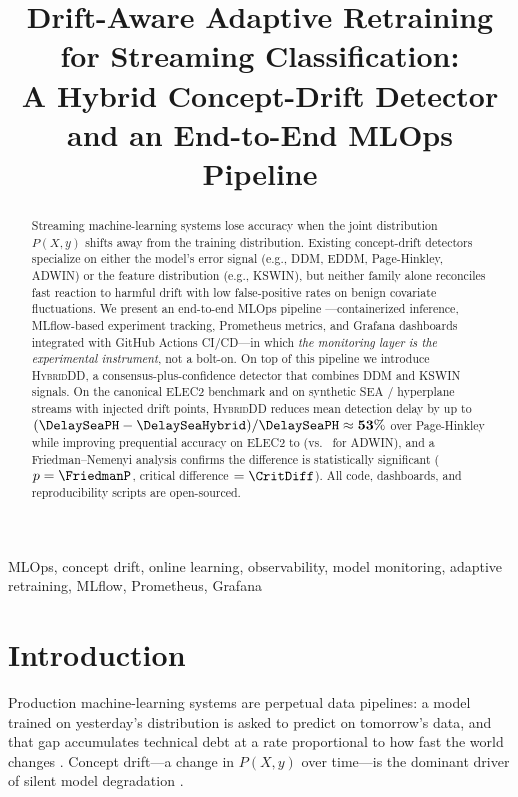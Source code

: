 \documentclass[conference]{IEEEtran}
\title{Drift-Aware Adaptive Retraining for Streaming Classification:\\
A Hybrid Concept-Drift Detector and an End-to-End MLOps Pipeline}
\author{
  \IEEEauthorblockN{Shahmir Asif}
  \IEEEauthorblockA{22i-1883 \\
    FAST-NUCES, Islamabad \\
    \texttt{i221883@nu.edu.pk}}
\and
  \IEEEauthorblockN{AbuBakr}
  \IEEEauthorblockA{22i-1934 \\
    FAST-NUCES, Islamabad \\
    \texttt{i221934@nu.edu.pk}}
\and
  \IEEEauthorblockN{Zaid}
  \IEEEauthorblockA{FAST-NUCES, Islamabad \\
    \texttt{zaid@nu.edu.pk}}
}
\begin{document}
\maketitle

\begin{abstract}
Streaming machine-learning systems lose accuracy when the joint distribution
$P(X, y)$ shifts away from the training distribution. Existing concept-drift
detectors specialize on either the model's error signal (e.g., DDM, EDDM,
Page-Hinkley, ADWIN) or the feature distribution (e.g., KSWIN), but neither
family alone reconciles fast reaction to harmful drift with low false-positive
rates on benign covariate fluctuations. We present an end-to-end MLOps pipeline
---containerized inference, MLflow-based experiment tracking, Prometheus
metrics, and Grafana dashboards integrated with GitHub Actions CI/CD---in which
\emph{the monitoring layer is the experimental instrument}, not a bolt-on. On
top of this pipeline we introduce \textsc{HybridDD}, a consensus-plus-confidence
detector that combines DDM and KSWIN signals. On the canonical ELEC2 benchmark
and on synthetic SEA / hyperplane streams with injected drift points,
\textsc{HybridDD} reduces mean detection delay by up to
$\mathbf{(\DelaySeaPH-\DelaySeaHybrid)/\DelaySeaPH \approx 53\%}$ over
Page-Hinkley while improving prequential accuracy on ELEC2 to
\AccElecHybrid{} (vs.\ \AccElecAdwin{} for ADWIN), and a Friedman--Nemenyi
analysis confirms the difference is statistically significant
($p=\FriedmanP$, critical difference $=\CritDiff$). All code, dashboards,
and reproducibility scripts are open-sourced.
\end{abstract}

\begin{IEEEkeywords}
MLOps, concept drift, online learning, observability, model monitoring,
adaptive retraining, MLflow, Prometheus, Grafana
\end{IEEEkeywords}

\section{Introduction}
\label{sec:intro}

Production machine-learning systems are perpetual data pipelines: a model
trained on yesterday's distribution is asked to predict on tomorrow's data,
and that gap accumulates technical debt at a rate proportional to how fast the
world changes \cite{sculley2015hidden, paleyes2022mlops}. Concept drift---a
change in $P(X, y)$ over time---is the dominant driver of silent model
degradation \cite{gama2014survey, lu2018learning, webb2016characterizing}.
\end{document}
